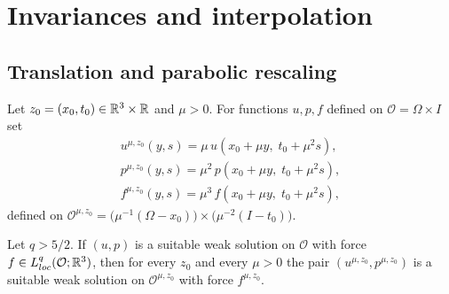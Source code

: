 \documentclass[11pt,reqno]{amsart}
\begin{document}
\section{Invariances and interpolation}\label{sec:scaling}

\subsection{Translation and parabolic rescaling}\label{ss:scaling}

\begin{definition}\label{def:rescaling}
Let $z_{0}=(x_{0},t_{0})\in\mathbb{R}^{3}\times\mathbb{R}$ and $\mu>0$. For functions
$u,p,f$ defined on $\mathcal{O}=\Omega\times I$ set
\begin{equation}\label{eq:rescaling}\begin{gathered}
  u^{\mu,z_{0}}(y,s)=\mu\,u(x_{0}+\mu y,\;t_{0}+\mu^{2}s),
  \\
  p^{\mu,z_{0}}(y,s)=\mu^{2}\,p(x_{0}+\mu y,\;t_{0}+\mu^{2}s),
  \\
  f^{\mu,z_{0}}(y,s)=\mu^{3}\,f(x_{0}+\mu y,\;t_{0}+\mu^{2}s),\end{gathered}
\end{equation}
defined on
$\mathcal{O}^{\mu,z_{0}}
 =\bigl(\mu^{-1}(\Omega-x_{0})\bigr)\times\bigl(\mu^{-2}(I-t_{0})\bigr)$.
\end{definition}

\begin{lemma}\label{lem:scaling-invariance}
Let $q>5/2$. If $(u,p)$ is a suitable weak solution on $\mathcal{O}$ with force
$f\in L^{q}_{loc}(\mathcal{O};\mathbb{R}^{3})$, then for every $z_{0}$ and every
$\mu>0$ the pair $(u^{\mu,z_{0}},p^{\mu,z_{0}})$ is a suitable weak solution on
$\mathcal{O}^{\mu,z_{0}}$ with force $f^{\mu,z_{0}}$.
\end{lemma}
\end{document}
